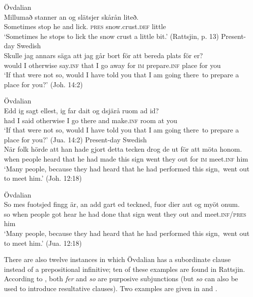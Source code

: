 \documentclass[output=paper]{langscibook}
\begin{document}
\ex Övdalian\label{ex:kalm:17b}\\ 
\gll Millumað stanner an og slätsjer skårån liteð.\\
Sometimes stop he and lick. \textsc{pres} snow.crust.\textsc{def} little\\
\glt ‘Sometimes he stops to lick the snow crust a little bit.’ (Rattsjin, p. 13)
\z 
\ex
\label{ex:kalm:18}
\ea Present-day Swedish\label{ex:kalm:18a}\\
\gll Skulle jag annars säga att jag går bort för att bereda plats för er?\\
would I otherwise say.\textsc{inf} that I go away for \textsc{im} prepare.\textsc{inf} place for you\\
\glt ‘If that were not so, would I have told you that I am going there{~}to prepare a place for you?’ (Joh. 14:2)

\ex Övdalian\label{ex:kalm:18b}\\
\gll Edd ig sagt ellest, ig far dait og dsjärå ruom ad id?\\
had I said otherwise I go there and make.\textsc{inf} room at you\\
 \glt ‘If that were not so, would I have told you that I am going there{~}to prepare a place for you?’ (Jua. 14:2)
\z 
\ex
\label{ex:kalm:19}
\ea Present-day Swedish\label{ex:kalm:19a}\\
\gll När folk hörde att han hade gjort detta tecken drog de ut för att möta honom.\\
when people heard that he had made this sign went they out for \textsc{im} meet.\textsc{inf} him\\
\glt ‘Many people, because they had heard that he had performed this sign,{~}went out to meet him.’ (Joh. 12:18)

\ex Övdalian\label{ex:kalm:19b}\\
\gll So mes fuotsjed fingg är, an add gart ed teckned, fuor dier aut og myöt onum.\\
so when people got hear he had done that sign went they out and meet.\textsc{inf/pres} him\\
\glt ‘Many people, because they had heard that he had performed this sign,{~}went out to meet him.’ (Jua. 12:18)
\z 
\z 


There are also twelve instances in which Övdalian has a subordinate clause instead of a prepositional infinitive; ten of these examples are found in Rattsjin. According to \citet[491]{AkerbergNystrom2012}, both \textit{fer} and \textit{so} are purposive subjunctions (but \textit{so} can also be used to introduce resultative clauses). Two examples are given in  and .  
\end{document}
